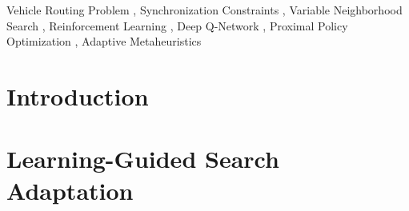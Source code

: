 \documentclass[preprint,12pt]{elsarticle}
\begin{document}
\begin{frontmatter}
\begin{keyword}
\small
Vehicle Routing Problem \sep 
Synchronization Constraints \sep 
Variable Neighborhood Search \sep 
Reinforcement Learning \sep 
Deep Q-Network \sep 
Proximal Policy Optimization \sep 
Adaptive Metaheuristics
\end{keyword}

\end{frontmatter}

\section{Introduction}
\label{sec:intro}







\section{Learning-Guided Search Adaptation} 
\label{sec:framework}








\end{document}
